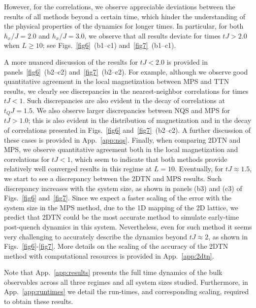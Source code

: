 \documentclass[aps,pra,reprint,amssymb,superscriptaddress]{revtex4-2}
\begin{document}
However, for the correlations, we observe appreciable deviations between the results of all methods beyond a certain time, which hinder the understanding of the physical properties of the dynamics for longer times. In particular, for both $h_x/J=2.0$ and $h_x/J=3.0$, we observe that all results deviate for times $tJ > 2.0$ when $L \ge 10$; see Figs.~\ref{fig6}~(b1--c1) and~\ref{fig7}~(b1--c1).

A more nuanced discussion of the results for $tJ < 2.0$ is provided in panels~\ref{fig6}~(b2--c2) and~\ref{fig7}~(b2--c2). 
For example, although we observe good quantitative agreement in the local magnetization between MPS and TTN results, we clearly see discrepancies in the nearest-neighbor correlations for times $tJ < 1$. Such discrepancies are also evident in the decay of correlations at $t_Q J = 1.5$. We also observe larger discrepancies between NQS and MPS for $tJ > 1.0$; this is also evident in the distribution of magnetization and in the decay of correlations presented in Figs.~\ref{fig6} and~\ref{fig7}~(b2--c2). A further discussion of these cases is provided in App.~\ref{app:nqs}. Finally, when comparing 2DTN and MPS, we observe quantitative agreement both in the local magnetization and correlations for $tJ < 1$, which seem to indicate that both methods provide relatively well converged results in this regime at $L=10$. Eventually, for $tJ\approx 1.5$, we start to see a discrepancy between the 2DTN and MPS results. Such discrepancy increases with the system size, as shown in panels (b3) and (c3) of Figs.~\ref{fig6} and~\ref{fig7}. Since we expect a faster scaling of the error with the system size in the MPS method, due to the 1D mapping of the 2D lattice, we predict that 2DTN could be the most accurate method to simulate early-time post-quench dynamics in this system. Nevertheless, even for such method it seems very challenging to accurately describe the dynamics beyond $tJ\approx 2$, as shown in Figs.~\ref{fig6}-\ref{fig7}. More details on the scaling of the accuracy of the 2DTN method with computational resources is provided in App.~\ref{app:2dtn}. 

Note that App.~\ref{app:results} presents the full time dynamics of the bulk observables across all three regimes and all system sizes studied. Furthermore, in App.~\ref{app:runtimes} we detail the run-times, and corresponding scaling, required to obtain these results.
\end{document}
